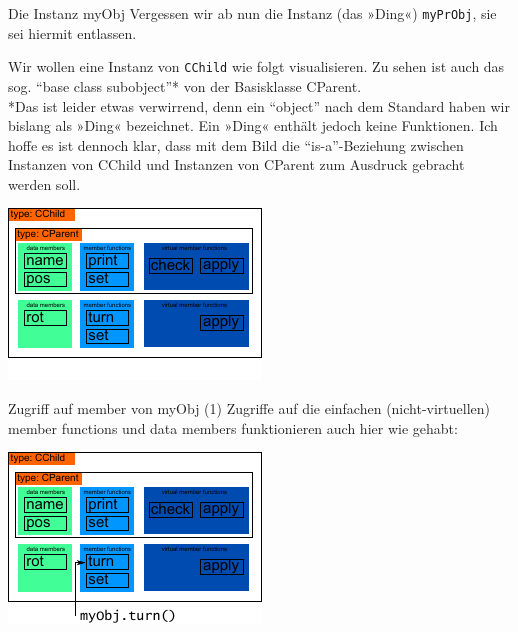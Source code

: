 \begin{frame}[fragile,b]{Die Instanz myObj}
	\tiny Vergessen wir ab nun die Instanz (das »Ding«) \verb|myPrObj|, sie sei hiermit entlassen.
	\normalsize
	
	\vspace{2em}
	
	Wir wollen eine Instanz von \verb|CChild| wie folgt visualisieren.
	Zu sehen ist auch das sog. \enquote{base class subobject}* von der Basisklasse CParent.\\
	\vspace{0.5em}
	\tiny
	*Das ist leider etwas verwirrend, denn ein \enquote{object} nach dem Standard haben wir bislang als »Ding« bezeichnet. Ein »Ding« enthält jedoch keine Funktionen. Ich hoffe es ist dennoch klar, dass mit dem Bild die \enquote{is-a}-Beziehung zwischen Instanzen von CChild und Instanzen von CParent zum Ausdruck gebracht werden soll.
	
	\vspace{2em}
	
	\includegraphics[width=0.5\linewidth]{images/myObj}
\end{frame}

\begin{frame}[fragile,b]{Zugriff auf member von myObj (1)}
	Zugriffe auf die einfachen (nicht-virtuellen) member functions und data members funktionieren auch hier wie gehabt:
	
	\vspace{2em}
	
	\includegraphics[width=0.5\linewidth]{images/myObj-turn}
\end{frame}

